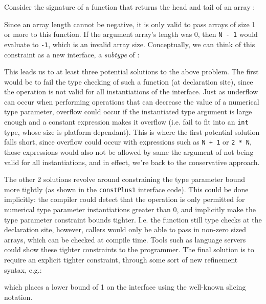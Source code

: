 Consider the signature of a function that returns the head and tail of an array
\autocite{rustConstBlog}:


Since an array length cannot be negative, it is only valid to pass arrays of
size 1 or more to this function. If the argument array's length was 0, then
\texttt{N - 1} would evaluate to \texttt{-1}, which is an invalid array size.
Conceptually, we can think of this constraint as a new interface, a
\emph{subtype} of :


This leads us to at least three potential solutions to the above problem. The
first would be to fail the type checking of such a function (at declaration
site), since the operation is not valid for all instantiations of the 
interface. Just as underflow can occur when performing operations that can
decrease the value of a numerical type parameter, overflow could occur if the
instantiated type argument is large enough and a constant expression makes it
overflow (i.e. fail to fit into an \texttt{int} type, whose size is platform
dependant). This is where the first potential solution falls short, since
overflow could occur with expressions such as \texttt{N + 1} or \texttt{2 * N},
those expressions would also not be allowed by same the argument of not being
valid for all instantiations, and in effect, we're back to the conservative
approach.

The other 2 solutions revolve around constraining the type parameter bound more
tightly (as shown in the \texttt{constPlus1} interface code). This could be done
implicitly: the compiler could detect that the operation is only permitted for
numerical type parameter instantiations greater than 0, and implicitly make the
type parameter constraint bounds tighter. I.e. the function still type checks at
the declaration site, however, callers would only be able to pass in non-zero
sized arrays, which can be checked at compile time. Tools such as language
servers could show these tighter constraints to the programmer. The final
solution is to require an explicit tighter constraint, through some sort of new
refinement syntax, e.g.:


which places a lower bound of 1 on the  interface using the well-known
slicing notation.

